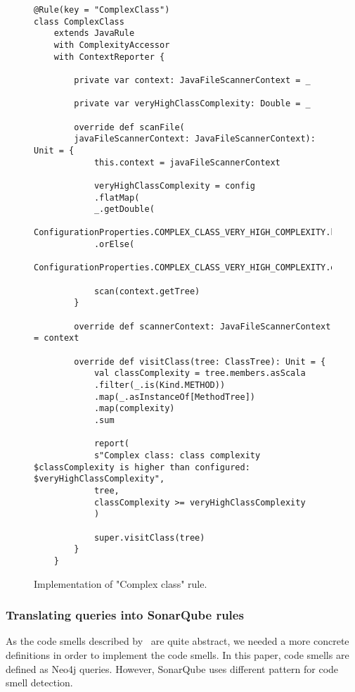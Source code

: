 \begin{figure} [htb]
    \lstset{language=Scala}
    \begin{lstlisting}
@Rule(key = "ComplexClass")
class ComplexClass
    extends JavaRule
    with ComplexityAccessor
    with ContextReporter {

        private var context: JavaFileScannerContext = _

        private var veryHighClassComplexity: Double = _

        override def scanFile(
        javaFileScannerContext: JavaFileScannerContext): Unit = {
            this.context = javaFileScannerContext

            veryHighClassComplexity = config
            .flatMap(
            _.getDouble(
            ConfigurationProperties.COMPLEX_CLASS_VERY_HIGH_COMPLEXITY.key))
            .orElse(
            ConfigurationProperties.COMPLEX_CLASS_VERY_HIGH_COMPLEXITY.defaultValue.toDouble)

            scan(context.getTree)
        }

        override def scannerContext: JavaFileScannerContext = context

        override def visitClass(tree: ClassTree): Unit = {
            val classComplexity = tree.members.asScala
            .filter(_.is(Kind.METHOD))
            .map(_.asInstanceOf[MethodTree])
            .map(complexity)
            .sum

            report(
            s"Complex class: class complexity $classComplexity is higher than configured: $veryHighClassComplexity",
            tree,
            classComplexity >= veryHighClassComplexity
            )

            super.visitClass(tree)
        }
    }
    \end{lstlisting}
    \caption{Implementation of "Complex class" rule.}
    \label{complex_class_implementation}
\end{figure}

\subsubsection{Translating queries into SonarQube rules}


As the code smells described by~\citeauthor{refactoring-fowler} are quite abstract, we needed
a more concrete definitions in order to implement the code smells.
In this paper, code smells are defined as Neo4j queries.
However, SonarQube uses different pattern for code smell detection.

